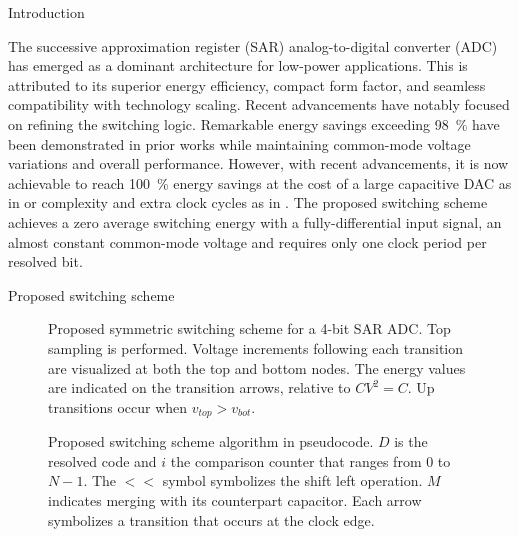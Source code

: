 \documentclass[final]{beamer}
\newlength{\colwidth}
\begin{document}
\begin{frame}[t]
\begin{columns}[t]
\begin{column}{\colwidth}
\begin{block}{Introduction}

The successive approximation register (SAR) analog-to-digital converter (ADC) has emerged as a dominant architecture for low-power applications. This is attributed to its superior energy efficiency, compact form factor, and seamless compatibility with technology scaling. Recent advancements have notably focused on refining the switching logic. Remarkable energy savings exceeding \SI{98}{\percent} have been demonstrated in prior works \cite{Wu17, Li20, Hu22, Momeni20} while maintaining common-mode voltage variations and overall performance. However, with recent advancements, it is now achievable to reach \SI{100}{\percent} energy savings at the cost of a large capacitive DAC as in \cite{Akbari19} or complexity and extra clock cycles as in \cite{Yousefi18}.    
% 
The proposed switching scheme achieves a zero average switching energy with a fully-differential input signal, an almost constant common-mode voltage and requires only one clock period per resolved bit.

  \end{block}


  \begin{block}{Proposed switching scheme}

      \begin{figure} \centering
              \centering
      	    
          	\caption{Proposed symmetric switching scheme for a 4-bit SAR ADC. Top sampling is performed. Voltage increments following each transition are visualized at both the top and bottom nodes. The energy values are indicated on the transition arrows, relative to $C V^2 = C$. Up transitions occur when $v_{top} > v_{bot}$.}
              \label{fig:scheme}
      \end{figure}


      \begin{figure} \centering
              \centering
      	    
              \caption{Proposed switching scheme algorithm in pseudocode. $D$ is the resolved code and $i$ the comparison counter that ranges from $0$ to $N-1$. The $<<$ symbol symbolizes the shift left operation. $M$ indicates merging with its counterpart capacitor. Each arrow symbolizes a transition that occurs at the clock edge.}
              \label{fig:algo}
      \end{figure}


\end{block}
\end{column}
\end{columns}
\end{frame}
\end{document}
